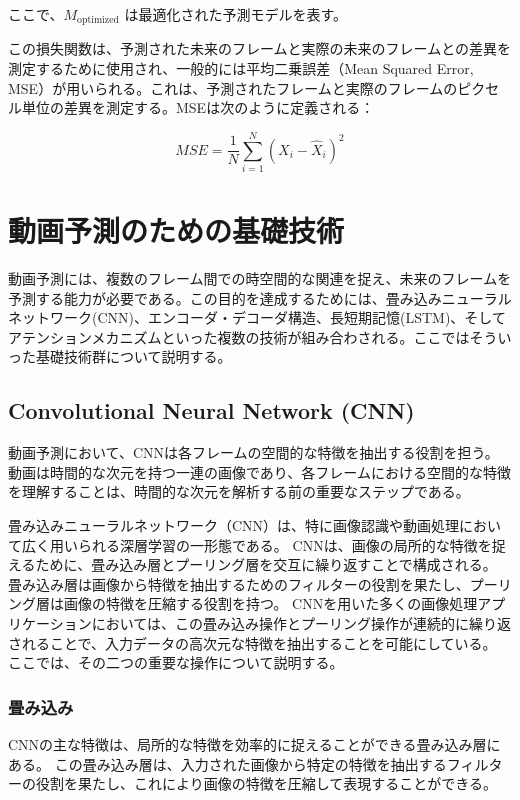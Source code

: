     ここで、\( M_{\text{optimized}} \) は最適化された予測モデルを表す。

    この損失関数は、予測された未来のフレームと実際の未来のフレームとの差異を測定するために使用され、一般的には平均二乗誤差（Mean Squared Error, MSE）が用いられる。これは、予測されたフレームと実際のフレームのピクセル単位の差異を測定する。MSEは次のように定義される：

    \begin{equation}
    MSE = \frac{1}{N} \sum_{i=1}^{N} (X_i - \hat{X}_i)^2
    \end{equation}

  \section{動画予測のための基礎技術}
    動画予測には、複数のフレーム間での時空間的な関連を捉え、未来のフレームを予測する能力が必要である。この目的を達成するためには、畳み込みニューラルネットワーク(CNN)、エンコーダ・デコーダ構造、長短期記憶(LSTM)、そしてアテンションメカニズムといった複数の技術が組み合わされる。ここではそういった基礎技術群について説明する。

    \subsection{Convolutional Neural Network (CNN)}
      動画予測において、CNNは各フレームの空間的な特徴を抽出する役割を担う。
      動画は時間的な次元を持つ一連の画像であり、各フレームにおける空間的な特徴を理解することは、時間的な次元を解析する前の重要なステップである。

      畳み込みニューラルネットワーク（CNN）は、特に画像認識や動画処理において広く用いられる深層学習の一形態である。
      CNNは、画像の局所的な特徴を捉えるために、畳み込み層とプーリング層を交互に繰り返すことで構成される。
      畳み込み層は画像から特徴を抽出するためのフィルターの役割を果たし、プーリング層は画像の特徴を圧縮する役割を持つ。
      CNNを用いた多くの画像処理アプリケーションにおいては、この畳み込み操作とプーリング操作が連続的に繰り返されることで、入力データの高次元な特徴を抽出することを可能にしている。
      ここでは、その二つの重要な操作について説明する。
    
      \subsubsection{畳み込み}
        CNNの主な特徴は、局所的な特徴を効率的に捉えることができる畳み込み層にある。
        この畳み込み層は、入力された画像から特定の特徴を抽出するフィルターの役割を果たし、これにより画像の特徴を圧縮して表現することができる。
        
